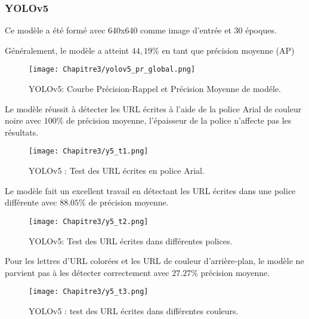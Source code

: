           \subsubsection{YOLOv5}
          Ce modèle a été formé avec 640x640 comme image d'entrée et 30 époques.
               
          Généralement, le modèle a atteint $44,19\%$ en tant que précision moyenne (AP)
          \begin{figure}[H]
                    \centering
                    \texttt{[image: Chapitre3/yolov5\_pr\_global.png]}
                    \caption{YOLOv5: Courbe Précision-Rappel et Précision Moyenne de modéle.}
                    \label{y4_pr}
                    \end{figure}
               
               
          Le modèle réussit à détecter les URL écrites à l'aide de la police Arial de couleur noire avec $100\%$ de précision moyenne, l'épaisseur de la police n'affecte pas les résultats. 
          \begin{figure}[H]
                    \centering
                    \texttt{[image: Chapitre3/y5\_t1.png]}
                    \caption{YOLOv5 : Test des URL écrites en police Arial.}
                    \label{y5_t1}
                    \end{figure}

          Le modèle fait un excellent travail en détectant les URL écrites dans une police différente avec $88.05\%$ de précision moyenne.
          \begin{figure}[H]
                    \centering
                    \texttt{[image: Chapitre3/y5\_t2.png]}
                    \caption{YOLOv5: Test des URL écrites dans différentes polices.}
                    \label{y5_t2}
                    \end{figure}

          Pour les lettres d'URL colorées et les URL de couleur d'arrière-plan, le modèle ne parvient pas à les détecter correctement avec $27.27\%$ précision moyenne.
          \begin{figure}[H]
                    \centering
                    \texttt{[image: Chapitre3/y5\_t3.png]}
                    \caption{YOLOv5 : test des URL écrites dans différentes couleurs.}
                    \label{y5_t3}
                    \end{figure}

